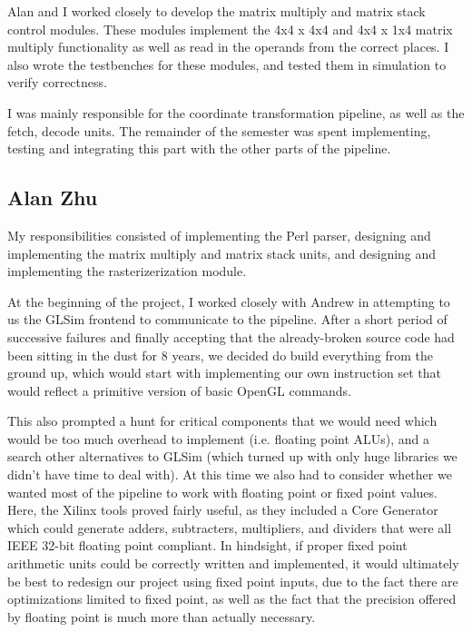 \documentclass[letterpaper,10pt]{article}
\begin{document}
Alan and I worked closely to develop the matrix multiply and matrix stack control modules. These modules implement the 4x4 x 4x4 and 4x4 x 1x4 matrix multiply functionality as well as read in the operands from the correct places. I also wrote the testbenches for these modules, and tested them in simulation to verify correctness.

I was mainly responsible for the coordinate transformation pipeline, as well as the fetch, decode units. The remainder of the semester was spent implementing, testing and integrating this part with the other parts of the pipeline.

\subsection{Alan Zhu}
My responsibilities consisted of implementing the Perl parser, designing and implementing the matrix multiply and matrix stack units, and designing and implementing the rasterizerization module.

At the beginning of the project, I worked closely with Andrew in attempting to us the GLSim frontend to communicate to the pipeline. After a short period of successive failures and finally accepting that the already-broken source code had been sitting in the dust for 8 years, we decided do build everything from the ground up, which would start with implementing our own instruction set that would reflect a primitive version of basic OpenGL commands. 

This also prompted a hunt for critical components that we would need which would be too much overhead to implement (i.e. floating point ALUs), and a search other alternatives to GLSim (which turned up with only huge libraries we didn't have time to deal with). At this time we also had to consider whether we wanted most of the pipeline to work with floating point or fixed point values. Here, the Xilinx tools proved fairly useful, as they included a Core Generator which could generate adders, subtracters, multipliers, and dividers that were all IEEE 32-bit floating point compliant. In hindsight, if proper fixed point arithmetic units could be correctly written and implemented, it would ultimately be best to redesign our project using fixed point inputs, due to the fact there are optimizations limited to fixed point, as well as the fact that the precision offered by floating point is much more than actually necessary.
\end{document}
